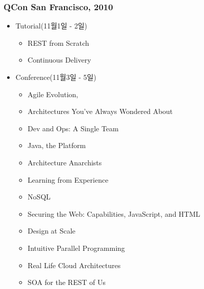 \begin{frame}
\frametitle{QCon San Francisco, 2010}

\begin{itemize}
\item Tutorial(11월1일 - 2일)
    \begin{itemize}
    \item REST from Scratch
    \item Continuous Delivery
    \end{itemize}
\item Conference(11월3일 - 5일)
    \begin{itemize}
    \item Agile Evolution, 
    \item Architectures You've Always Wondered About
    \item Dev and Ops: A Single Team
    \item Java, the Platform
    \item Architecture Anarchists
    \item Learning from Experience
    \item NoSQL
    \item Securing the Web: Capabilities, JavaScript, and HTML
    \item Design at Scale
    \item Intuitive Parallel Programming
    \item Real Life Cloud Architectures
    \item SOA for the REST of Us
    \end{itemize}
\end{itemize}

\end{frame}
